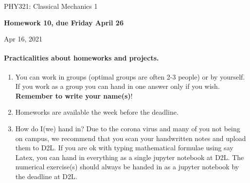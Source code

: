 \documentclass[%
oneside,                 %
final,                   %
10pt]{article}
\begin{document}

\newcommand{\exercisesection}[1]{\subsection*{#1}}






\thispagestyle{empty}

\begin{center}
{\LARGE\bf
\begin{spacing}{1.25}
PHY321: Classical Mechanics 1
\end{spacing}
}
\end{center}


\begin{center}
{\bf Homework 10, due Friday  April 26${}^{}$} \\ [0mm]
\end{center}

\begin{center}
\end{center}
    

\begin{center}
Apr 16, 2021
\end{center}

\vspace{1cm}


\paragraph{Practicalities about  homeworks and projects.}
\begin{enumerate}
\item You can work in groups (optimal groups are often 2-3 people) or by yourself. If you work as a group you can hand in one answer only if you wish. \textbf{Remember to write your name(s)}!

\item Homeworks are available  the week before the deadline. 

\item How do I(we)  hand in?  Due to the corona virus and many of you not being on campus, we recommend that you scan your handwritten notes and upload them to D2L. If you are ok with typing mathematical formulae using say Latex, you can hand in everything as a single jupyter notebook at D2L. The numerical exercise(s) should always be handed in as a jupyter notebook by the deadline at D2L. 
\end{enumerate}
\end{document}
